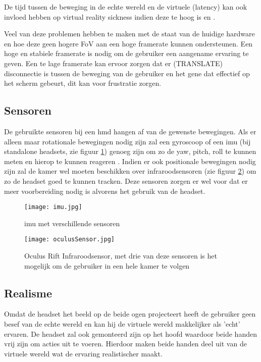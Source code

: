 De tijd tussen de beweging in de echte wereld en de virtuele (latency) kan ook invloed hebben op virtual reality sickness indien deze te hoog is \autocite{Elbamby2018} en \autocite{DiZio2000}. 

Veel van deze problemen hebben te maken met de staat van de huidige hardware en hoe deze geen hogere FoV aan een hoge framerate kunnen ondersteunen. Een hoge en stabiele framerate is nodig om de gebruiker een aangename ervaring te geven. Een te lage framerate kan ervoor zorgen dat er (TRANSLATE) disconnectie is tussen de beweging van de gebruiker en het gene dat effectief op het scherm gebeurt, dit kan voor frustratie zorgen.

\subsection{Sensoren}
De gebruikte sensoren bij een \acrshort{hmd} hangen af van de gewenste bewegingen. Als er alleen maar rotationale bewegingen nodig zijn zal een gyroscoop of een \acrfull{imu} (bij standalone headsets, zie figuur \ref{fig:imu}) genoeg zijn om zo de yaw, pitch, roll te kunnen meten en hierop te kunnen reageren \autocite{LaValle2014}. Indien er ook positionale bewegingen nodig zijn zal de kamer wel moeten beschikken over infraroodsensoren (zie figuur \ref{fig:oculusSensor}) om zo de headset goed te kunnen tracken. Deze sensoren zorgen er wel voor dat er meer voorbereiding nodig is alvorens het gebruik van de headset.

\begin{figure}
    \texttt{[image: imu.jpg]}
    \caption{\acrshort{imu} met verschillende sensoren \autocite{Shirsath2018}}
    \label{fig:imu}
\end{figure}

\begin{figure}
    \texttt{[image: oculusSensor.jpg]}
    \caption{Oculus Rift Infraroodsensor, met drie van deze sensoren is het mogelijk om de gebruiker in een hele kamer te volgen \autocite{Oculus2019}}
    \label{fig:oculusSensor}
\end{figure}


\subsection{Realisme}
Omdat de headset het beeld op de beide ogen projecteert heeft de gebruiker geen besef van de echte wereld en kan hij de virtuele wereld makkelijker als 'echt' ervaren. De headset zal ook gemonteerd zijn op het hoofd waardoor beide handen vrij zijn om acties uit te voeren. Hierdoor maken beide handen deel uit van de virtuele wereld wat de ervaring realistischer maakt.

